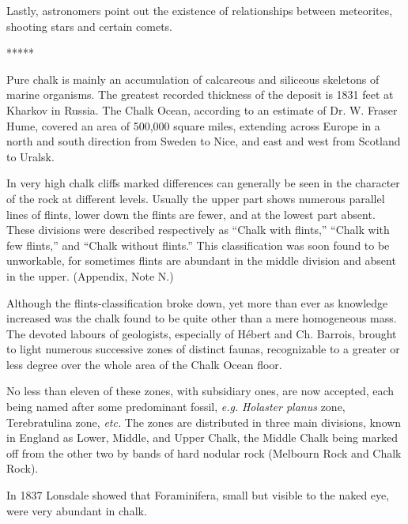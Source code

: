 \documentclass[a4paper, 12pt, oneside, landscape]{article}
\begin{document}
Lastly, astronomers point out the existence of relationships between meteorites, shooting stars and certain comets.

\centerline{*\hspace{15mm}*\hspace{15mm}*\hspace{15mm}*\hspace{15mm}*}
\bigskip

Pure chalk is mainly an accumulation of calcareous and siliceous skeletons of marine organisms. The greatest recorded thickness of the deposit is 1831 feet at Kharkov in Russia. The Chalk Ocean, according to an estimate of Dr. W. Fraser Hume, covered an area of 500,000 square miles, extending across Europe in a north and south direction from Sweden to Nice, and east and west from Scotland to Uralsk.

In very high chalk cliffs marked differences can generally be seen in the character of the rock at different levels. Usually the upper part shows numerous parallel lines of flints, lower down the flints are fewer, and at the lowest part absent. These divisions were described respectively as ``Chalk with flints,'' ``Chalk with few flints,'' and ``Chalk without flints.'' This classification was soon found to be unworkable, for sometimes flints are abundant in the middle division and absent in the upper. (Appendix, Note N.)

Although the flints-classification broke down, yet more than ever as knowledge increased was the chalk found to be quite other than a mere homogeneous mass. The devoted labours of geologists, especially of Hébert and Ch. Barrois, brought to light numerous successive zones of distinct faunas, recognizable to a greater or less degree over the whole area of the Chalk Ocean floor.

No less than eleven of these zones, with subsidiary ones, are now accepted, each being named after some predominant fossil, \emph{e.g.} \emph{Holaster planus} zone, Terebratulina zone, \emph{etc.} The zones are distributed in three main divisions, known in England as Lower, Middle, and Upper Chalk, the Middle Chalk being marked off from the other two by bands of hard nodular rock (Melbourn Rock and Chalk Rock).

In 1837 Lonsdale showed that Foraminifera, small but visible to the naked eye, were very abundant in chalk.
\end{document}

